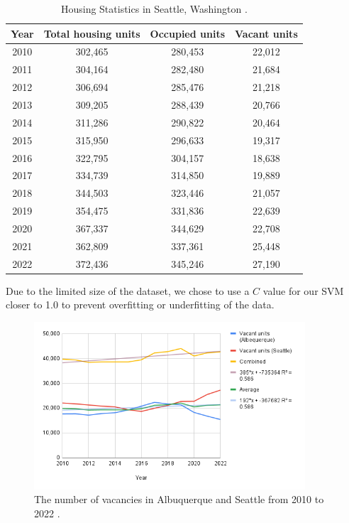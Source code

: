 \documentclass[12pt]{article}
\begin{document}
\begin{table}[H]
  \centering
  \begin{tabular}{|c c c c|}
    \hline
    Year & Total housing units & Occupied units & Vacant units \\ [0.5ex]
    \hline
    2010 & 302,465 & 280,453 & 22,012 \\
    2011 & 304,164 & 282,480 & 21,684 \\
    2012 & 306,694 & 285,476 & 21,218 \\
    2013 & 309,205 & 288,439 & 20,766 \\
    2014 & 311,286 & 290,822 & 20,464 \\
    2015 & 315,950 & 296,633 & 19,317 \\
    2016 & 322,795 & 304,157 & 18,638 \\
    2017 & 334,739 & 314,850 & 19,889 \\
    2018 & 344,503 & 323,446 & 21,057 \\
    2019 & 354,475 & 331,836 & 22,639 \\
    2020 & 367,337 & 344,629 & 22,708 \\
    2021 & 362,809 & 337,361 & 25,448 \\
    2022 & 372,436 & 345,246 & 27,190 \\ [1ex]
    \hline
  \end{tabular}
  \caption{Housing Statistics in Seattle, Washington \cite{Census2010ACSDP5Y2010.DP04}.}
\end{table}

\noindent
Due to the limited size of the dataset, we chose to use a $C$ value for our SVM closer to 1.0 to prevent overfitting or
underfitting of the data. 

\begin{figure}[H]
  \centering
  \includegraphics[width=0.9\textwidth]{vacancy}
  \caption{The number of vacancies in Albuquerque and Seattle from 2010 to 2022 \cite{Census2010ACSDP1Y2010.DP04,Census2010ACSDP5Y2010.DP04}.}
\end{figure}
\end{document}

